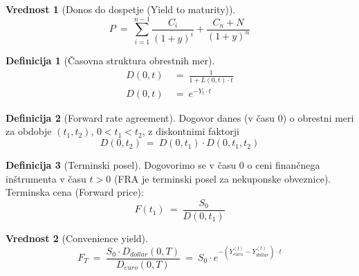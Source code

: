 \documentclass[11pt]{article}
\theoremstyle{definition}
\newtheorem{definicija}{Definicija}[section]
\theoremstyle{definition}
\newtheorem{vrednost}{Vrednost}
\begin{document}
\begin{vrednost}[Donos do dospetje (Yield to maturity)]

$$P ~=~ \sum_{i=1}^{n-1} \frac{C_i}{(1+y)^i} + \frac{C_n + N}{(1+y)^n}$$

\end{vrednost}
\vspace{0.5cm}

\begin{definicija}[Časovna struktura obrestnih mer]

\begin{align*}
D(0, t) ~&=~ \frac{1}{1 + L(0, t) \cdot t} \\
D(0, t) ~&=~ e^{-Y_t \cdot t}
\end{align*}

\end{definicija}
\vspace{0.5cm}

\begin{definicija}[Forward rate agreement]

Dogovor danes (v času $0$) o obrestni meri za obdobje $(t_1, t_2)$, $0 < t_1 < t_2$, z diskontnimi faktorji
$$D(0, t_2) ~=~ D(0, t_1) \cdot D(0, t_1, t_2)$$

\end{definicija}
\vspace{0.5cm}

\begin{definicija}[Terminski posel]

Dogovorimo se v času $0$ o ceni finančnega inštrumenta v času $t>0$ (FRA je terminski posel za nekuponske obveznice). Terminska cena (Forward price):
$$F(t_1) ~=~ \frac{S_0}{D(0, t_1)}$$

\end{definicija}
\vspace{0.5cm}

\begin{vrednost}[Convenience yield]

$$F_T ~=~ \frac{S_0 \cdot D_{dollar}(0, T)}{D_{euro}(0, T)} ~=~ S_0 \cdot e^{-\left( Y_{euro}^{(t)} - Y_{dollar}^{(t)} \right) \cdot t}$$

\end{vrednost}
\vspace{0.5cm}
\end{document}
